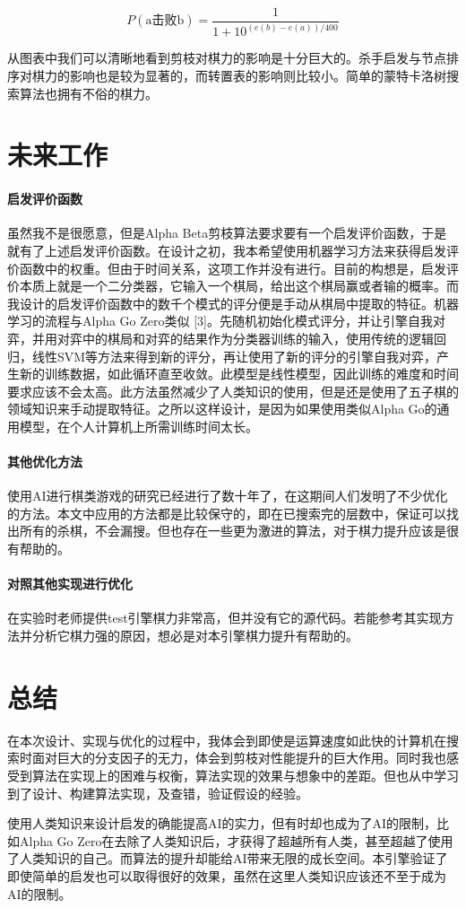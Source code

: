 \documentclass{article}
\begin{document}
\begin{equation}
    P(\text{a击败b})=\frac{1}{1+10^{(e(b)-e(a))/400}}
\end{equation}

从图表中我们可以清晰地看到剪枝对棋力的影响是十分巨大的。杀手启发与节点排序对棋力的影响也是较为显著的，而转置表的影响则比较小。简单的蒙特卡洛树搜索算法也拥有不俗的棋力。

\section{未来工作}
\paragraph{启发评价函数} 虽然我不是很愿意，但是Alpha Beta剪枝算法要求要有一个启发评价函数，于是就有了上述启发评价函数。在设计之初，我本希望使用机器学习方法来获得启发评价函数中的权重。但由于时间关系，这项工作并没有进行。目前的构想是，启发评价本质上就是一个二分类器，它输入一个棋局，给出这个棋局赢或者输的概率。而我设计的启发评价函数中的数千个模式的评分便是手动从棋局中提取的特征。机器学习的流程与Alpha Go Zero类似 [3]。先随机初始化模式评分，并让引擎自我对弈，并用对弈中的棋局和对弈的结果作为分类器训练的输入，使用传统的逻辑回归，线性SVM等方法来得到新的评分，再让使用了新的评分的引擎自我对弈，产生新的训练数据，如此循环直至收敛。此模型是线性模型，因此训练的难度和时间要求应该不会太高。此方法虽然减少了人类知识的使用，但是还是使用了五子棋的领域知识来手动提取特征。之所以这样设计，是因为如果使用类似Alpha Go的通用模型，在个人计算机上所需训练时间太长。

\paragraph{其他优化方法} 使用AI进行棋类游戏的研究已经进行了数十年了，在这期间人们发明了不少优化的方法。本文中应用的方法都是比较保守的，即在已搜索完的层数中，保证可以找出所有的杀棋，不会漏搜。但也存在一些更为激进的算法，对于棋力提升应该是很有帮助的。

\paragraph{对照其他实现进行优化} 在实验时老师提供test引擎棋力非常高，但并没有它的源代码。若能参考其实现方法并分析它棋力强的原因，想必是对本引擎棋力提升有帮助的。

\section{总结}

在本次设计、实现与优化的过程中，我体会到即使是运算速度如此快的计算机在搜索时面对巨大的分支因子的无力，体会到剪枝对性能提升的巨大作用。同时我也感受到算法在实现上的困难与权衡，算法实现的效果与想象中的差距。但也从中学习到了设计、构建算法实现，及查错，验证假设的经验。

使用人类知识来设计启发的确能提高AI的实力，但有时却也成为了AI的限制，比如Alpha Go Zero在去除了人类知识后，才获得了超越所有人类，甚至超越了使用了人类知识的自己。而算法的提升却能给AI带来无限的成长空间。本引擎验证了即使简单的启发也可以取得很好的效果，虽然在这里人类知识应该还不至于成为AI的限制。
\end{document}
